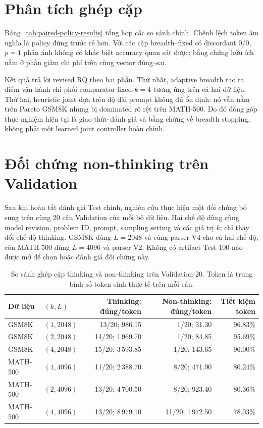 \section{Phân tích ghép cặp}

Bảng~\ref{tab:paired-policy-results} tổng hợp các so sánh chính. Chênh lệch
token âm nghĩa là policy đứng trước rẻ hơn. Với các cặp breadth--fixed có
discordant 0/0, $p=1$ phản ánh không có khác biệt accuracy quan sát được; bằng
chứng hữu ích nằm ở phần giảm chi phí trên cùng vector đúng--sai.



Kết quả trả lời revised RQ theo hai phần. Thứ nhất, adaptive breadth tạo ra
điểm vận hành chi phối comparator fixed-$k=4$ tương ứng trên cả hai dữ liệu.
Thứ hai, heuristic joint dựa trên độ dài prompt không đủ ổn định: nó vẫn nằm
trên Pareto GSM8K nhưng bị dominated rõ rệt trên MATH-500. Do đó đóng góp thực
nghiệm hiện tại là giao thức đánh giá và bằng chứng về breadth stopping, không
phải một learned joint controller hoàn chỉnh.

\section{Đối chứng non-thinking trên Validation}

Sau khi hoàn tất đánh giá Test chính, nghiên cứu thực hiện một đối chứng bổ
sung trên cùng 20 câu Validation của mỗi bộ dữ liệu. Hai chế độ dùng cùng
model revision, problem ID, prompt, sampling setting và các giá trị $k$; chỉ
thay đổi chế độ thinking. GSM8K dùng $L=2048$ và cùng parser V4 cho cả hai chế
độ, còn MATH-500 dùng $L=4096$ và parser V2. Không có artifact Test-100 nào
được mở để chọn hoặc đánh giá đối chứng này.

\begin{table}[htbp]
  \centering
  \caption{So sánh ghép cặp thinking và non-thinking trên Validation-20. Token
  là trung bình số token sinh thực tế trên mỗi câu.}
  \label{tab:nonthinking-validation}
  \scriptsize
  \begin{tabular}{llrrr}
    \toprule
    Dữ liệu & $(k,L)$ & Thinking: đúng/token & Non-thinking: đúng/token & Tiết kiệm token \\
    \midrule
    GSM8K & $(1,2048)$ & 13/20; 986.15 & 1/20; 31.30 & 96.83\% \\
    GSM8K & $(2,2048)$ & 14/20; 1\,969.70 & 1/20; 84.85 & 95.69\% \\
    GSM8K & $(4,2048)$ & 15/20; 3\,593.85 & 1/20; 143.65 & 96.00\% \\
    MATH-500 & $(1,4096)$ & 11/20; 2\,388.70 & 8/20; 471.90 & 80.24\% \\
    MATH-500 & $(2,4096)$ & 13/20; 4\,700.50 & 8/20; 923.40 & 80.36\% \\
    MATH-500 & $(4,4096)$ & 13/20; 8\,979.10 & 11/20; 1\,972.50 & 78.03\% \\
    \bottomrule
  \end{tabular}
\end{table}

